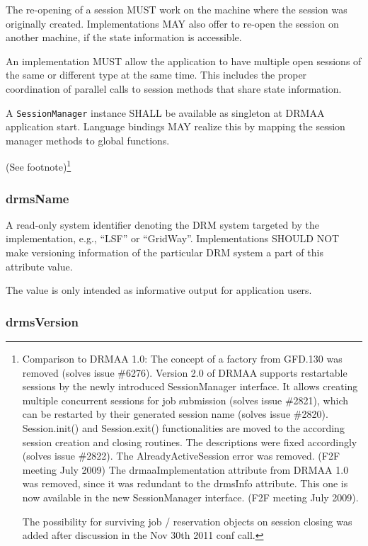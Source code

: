 \documentclass{article}
\newcommand{\h}[1]{\lstinline|#1|}
\newcommand{\langbind}[1]{\begin{shaded}#1\end{shaded}}
\newcommand{\rat}[1]{ {\tiny(See footnote)}\footnote{#1} }
\begin{document}
The re-opening of a session MUST work on the machine where the session was originally created. Implementations MAY also offer to re-open the session on another machine, if the state information is accessible. 

An implementation MUST allow the application to have multiple open sessions of the same or different type at the same time. This includes the proper coordination of parallel calls to session methods that share state information.

\langbind{
A \h{SessionManager} instance SHALL be available as singleton at DRMAA application start. Language bindings MAY realize this by mapping the session manager methods to global functions. 
}

\rat{
Comparison to DRMAA 1.0:
The concept of a factory from GFD.130 was removed (solves issue \#6276). Version 2.0 of DRMAA supports restartable sessions by the newly introduced SessionManager interface. It allows creating multiple concurrent sessions for job submission (solves issue \#2821), which can be restarted by their generated session name (solves issue \#2820). Session.init() and Session.exit() functionalities are moved to the according session creation and closing routines. The descriptions were fixed accordingly (solves issue \#2822). The AlreadyActiveSession error was removed. (F2F meeting July 2009) The drmaaImplementation attribute from DRMAA 1.0 was removed, since it was redundant to the drmsInfo attribute. This one is now available in the new SessionManager interface. (F2F meeting July 2009).

The possibility for surviving job / reservation objects on session closing was added after discussion in the Nov 30th 2011 conf call.
}

\subsubsection{drmsName}

A read-only system identifier denoting the DRM system targeted by the implementation, e.g., \enquote{LSF} or \enquote{GridWay}. Implementations SHOULD NOT make versioning information of the particular DRM system a part of this attribute value.

The value is only intended as informative output for application users.

\subsubsection{drmsVersion}
\end{document}
